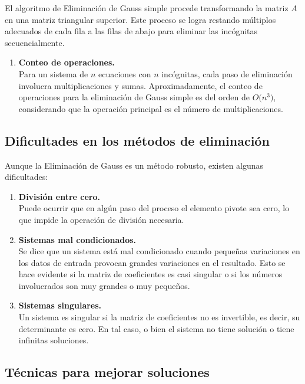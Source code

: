 \documentclass[12pt,letterpaper]{article}
\theoremstyle{definition}
\theoremstyle{plain}
\theoremstyle{remark}
\begin{document}
El algoritmo de Eliminación de Gauss simple procede transformando la matriz $A$ en una matriz triangular superior. Este proceso se logra restando múltiplos adecuados de cada fila a las filas de abajo para eliminar las incógnitas secuencialmente.

\begin{enumerate}
    \item \textbf{Conteo de operaciones.}\\
    Para un sistema de $n$ ecuaciones con $n$ incógnitas, cada paso de eliminación involucra multiplicaciones y sumas. Aproximadamente, el conteo de operaciones para la eliminación de Gauss simple es del orden de $O\bigl(n^3\bigr)$, considerando que la operación principal es el número de multiplicaciones.
\end{enumerate}

\subsection{Dificultades en los métodos de eliminación}

Aunque la Eliminación de Gauss es un método robusto, existen algunas dificultades:

\begin{enumerate}
    \item \textbf{División entre cero.}\\
    Puede ocurrir que en algún paso del proceso el elemento pivote sea cero, lo que impide la operación de división necesaria.

    \item \textbf{Sistemas mal condicionados.}\\
    Se dice que un sistema está mal condicionado cuando pequeñas variaciones en los datos de entrada provocan grandes variaciones en el resultado. Esto se hace evidente si la matriz de coeficientes es casi singular o si los números involucrados son muy grandes o muy pequeños.

    \item \textbf{Sistemas singulares.}\\
    Un sistema es singular si la matriz de coeficientes no es invertible, es decir, su determinante es cero. En tal caso, o bien el sistema no tiene solución o tiene infinitas soluciones.
\end{enumerate}

\subsection{Técnicas para mejorar soluciones}
\end{document}
